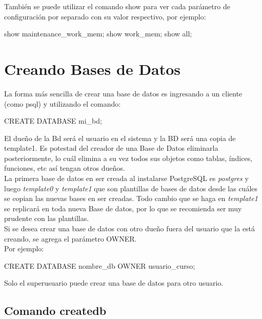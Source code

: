 También se puede utilizar el comando show para ver cada parámetro de configuración por separado con su valor respectivo, por ejemplo:\\

\begin{pyglist}
show maintenance_work_mem;
show work_mem;
show all;
\end{pyglist}

\section{Creando Bases de Datos}

La forma más sencilla de crear una base de datos es ingresando a un cliente (como psql) y utilizando el comando:\\

\begin{pyglist}
CREATE DATABASE mi_bd;
\end{pyglist}

El dueño de la Bd será el usuario en el sistema y la BD será una copia de template1. Es potestad del creador de una Base de Datos eliminarla posteriormente, lo cuál elimina a su vez todos sus objetos como tablas, índices, funciones, etc así tengan otros dueños.\\

La primera base de datos en ser creada al instalarse PostgreSQL es \textit{postgres} y luego \textit{template0} y \textit{template1} que son plantillas de bases de datos desde las cuáles se copian las nuevas bases en ser creadas. Todo cambio que se haga en \textit{template1} se replicará en toda nueva Base de datos, por lo que se recomienda ser muy prudente con las plantillas.\\

Si se desea crear una base de datos con otro dueño fuera del usuario que la está creando, se agrega el parámetro OWNER.\\

Por ejemplo:\\

\begin{pyglist}
CREATE DATABASE nombre_db OWNER usuario_curso;
\end{pyglist}

Solo el superusuario puede crear una base de datos para otro usuario.


\subsection{Comando createdb}

